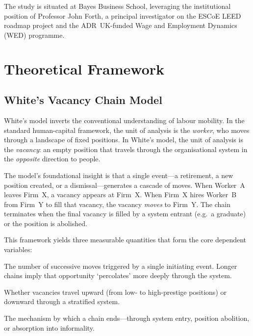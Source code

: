 \documentclass[a4paper]{tufte-handout}
\begin{document}
\noindent
The study is situated at Bayes Business School, leveraging the institutional position of Professor John Forth, a principal investigator on the ESCoE LEED roadmap project and the ADR~UK-funded Wage and Employment Dynamics (WED) programme.


\section{Theoretical Framework}

\subsection{White's Vacancy Chain Model}

White's model inverts the conventional understanding of labour mobility.
In the standard human-capital framework, the unit of analysis is the \emph{worker}, who moves through a landscape of fixed positions. In White's model, the unit of analysis is the \emph{vacancy}: an empty position that travels through the organisational system in the \emph{opposite} direction to people.

The model's foundational insight is that a single event---a retirement, a new position created, or a dismissal---generates a cascade of moves. When Worker~A leaves Firm~X, a vacancy appears at Firm~X\@. When Firm~X hires Worker~B from Firm~Y to fill that vacancy, the vacancy \emph{moves} to Firm~Y\@. The chain terminates when the final vacancy is filled by a system entrant (e.g.\ a graduate) or the position is abolished.

This framework yields three measurable quantities that form the core dependent variables:

\begin{description}[style=nextline, font=\normalfont\itshape]
  \item[Chain Length (Multiplier)]
    The number of successive moves triggered by a single initiating event.
    Longer chains imply that opportunity `percolates' more deeply through the system.
  \item[Chain Direction]
    Whether vacancies travel upward (from low- to high-prestige positions) or downward through a stratified system.
  \item[Chain Termination]
    The mechanism by which a chain ends---through system entry, position abolition, or absorption into informality.
\end{description}
\end{document}

